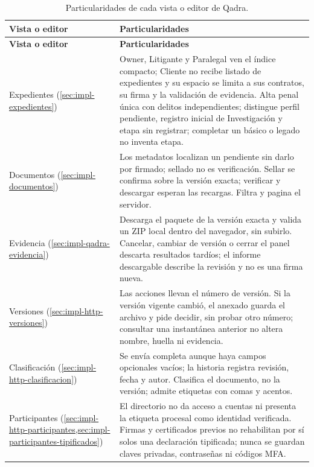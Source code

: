 \begin{longtable}{@{}L{2.9cm}L{\dimexpr\linewidth-2.9cm-2\tabcolsep\relax}@{}}
  \caption{Particularidades de cada vista o editor de Qadra.}
  \label{tab:impl-qadra-vistas} \\
    \toprule
    \textbf{Vista o editor} & \textbf{Particularidades} \\
    \midrule
    \endfirsthead
    \toprule
    \textbf{Vista o editor} & \textbf{Particularidades} \\
    \midrule
    \endhead
    \bottomrule
    \endlastfoot
    Expedientes (\cref{sec:impl-expedientes}) & Owner, Litigante y Paralegal ven el índice compacto; Cliente no recibe listado de expedientes y su espacio se limita a sus contratos, su firma y la validación de evidencia. Alta penal única con delitos independientes; distingue perfil pendiente, registro inicial de Investigación y etapa sin registrar; completar un básico o legado no inventa etapa. \\
    Documentos (\cref{sec:impl-documentos}) & Los metadatos localizan un pendiente sin darlo por firmado; sellado no es verificación. Sellar se confirma sobre la versión exacta; verificar y descargar esperan las recargas. Filtra y pagina el servidor. \\
    Evidencia (\cref{sec:impl-qadra-evidencia}) & Descarga el paquete de la versión exacta y valida un ZIP local dentro del navegador, sin subirlo. Cancelar, cambiar de versión o cerrar el panel descarta resultados tardíos; el informe descargable describe la revisión y no es una firma nueva. \\
    Versiones (\cref{sec:impl-http-versiones}) & Las acciones llevan el número de versión. Si la versión vigente cambió, el anexado guarda el archivo y pide decidir, sin probar otro número; consultar una instantánea anterior no altera nombre, huella ni evidencia. \\
    Clasificación (\cref{sec:impl-http-clasificacion}) & Se envía completa aunque haya campos opcionales vacíos; la historia registra revisión, fecha y autor. Clasifica el documento, no la versión; admite etiquetas con comas y acentos. \\
    Participantes (\cref{sec:impl-http-participantes,sec:impl-participantes-tipificados}) & El directorio no da acceso a cuentas ni presenta la etiqueta procesal como identidad verificada. Firmas y certificados previos no rehabilitan por sí solos una declaración tipificada; nunca se guardan claves privadas, contraseñas ni códigos MFA. \\

\end{longtable}
